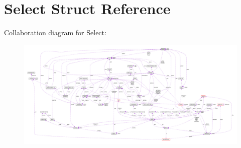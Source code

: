 \hypertarget{structSelect}{}\section{Select Struct Reference}
\label{structSelect}


Collaboration diagram for Select\+:\nopagebreak
\begin{figure}[H]
\begin{center}
\leavevmode
\includegraphics[width=350pt]{structSelect__coll__graph}
\end{center}
\end{figure}
